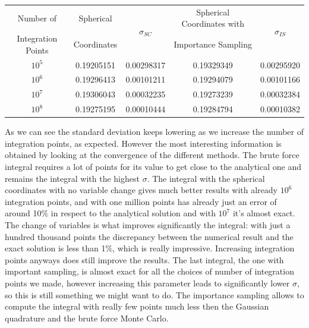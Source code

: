 \documentclass[10pt,a4paper,titlepage]{article}
\begin{document}
\begin{center}
\begin{tabular}{|c|c|c|c|c|}
\hline
Number of           &  Spherical    & \multirow{2}{*}{$\sigma_{SC}$}&   Spherical Coordinates with  &\multirow{2}{*}{$\sigma_{IS}$}  \\
Integration Points  &  Coordinates  &                               &   Importance Sampling         &                                \\\hline
$10^5$              &  0.19205151   &   0.00298317                  &   0.19329349                  & 0.00295920                     \\\hline
$10^6$              &  0.19296413   &   0.00101211                  &   0.19294079                  & 0.00101166                     \\\hline
$10^7$              &  0.19306043   &   0.00032235                  &   0.19273239                  & 0.00032384                     \\\hline
$10^8$              &  0.19275195   &   0.00010444                  &   0.19284794                  & 0.00010382                     \\\hline
\end{tabular}
\end{center}
As we can see the standard deviation keeps lowering as we increase the number of integration points, as expected. However the most interesting information is obtained by looking at the convergence of the different methods. The brute force integral requires a lot of points for its value to get close to the analytical one and remains the integral with the highest $\sigma$. The integral with the spherical coordinates with no variable change gives much better results with already $10^6$ integration points, and with one million points has already just an error of around 10\% in respect to the analytical solution and with $10^7$ it's almost exact.\\
The change of variables is what improves significantly the integral: with just a hundred thousand points the discrepancy between the numerical result and the exact solution is less than 1\%, which is really impressive. Increasing integration points anyways does still improve the results. The last integral, the one with important sampling, is almost exact for all the choices of number of integration points we made, however increasing this parameter leads to significantly lower $\sigma$, so this is still something we might want to do. The importance sampling allows to compute the integral with really few points much less then the Gaussian quadrature and the brute force Monte Carlo. 
\end{document}
